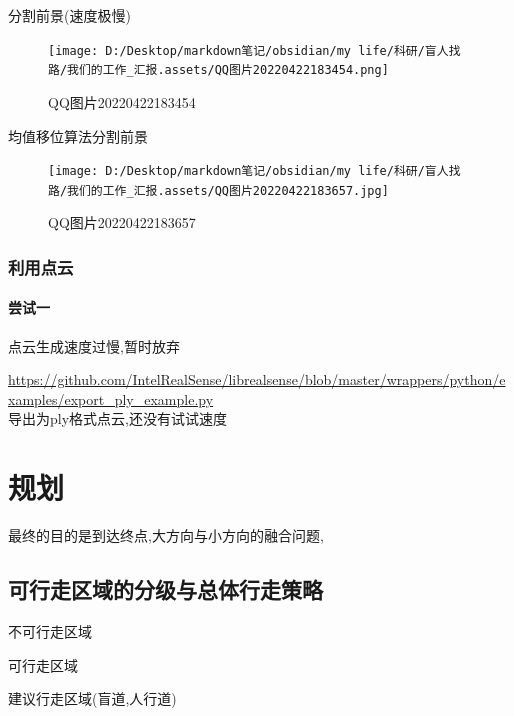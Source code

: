 \documentclass[]{article}
\let\oldparagraph\paragraph
\renewcommand{\paragraph}[1]{\oldparagraph{#1}\mbox{}}
\begin{document}
分割前景(速度极慢)

\begin{figure}
\centering
\texttt{[image: D:/Desktop/markdown笔记/obsidian/my life/科研/盲人找路/我们的工作\_汇报.assets/QQ图片20220422183454.png]}
\caption{QQ图片20220422183454}
\end{figure}

均值移位算法分割前景

\begin{figure}
\centering
\texttt{[image: D:/Desktop/markdown笔记/obsidian/my life/科研/盲人找路/我们的工作\_汇报.assets/QQ图片20220422183657.jpg]}
\caption{QQ图片20220422183657}
\end{figure}

\hypertarget{ux5229ux7528ux70b9ux4e91}{%
\subsubsection{利用点云}\label{ux5229ux7528ux70b9ux4e91}}

\hypertarget{ux5c1dux8bd5ux4e00}{%
\paragraph{尝试一}\label{ux5c1dux8bd5ux4e00}}

点云生成速度过慢,暂时放弃

\url{https://github.com/IntelRealSense/librealsense/blob/master/wrappers/python/examples/export_ply_example.py}\\
导出为ply格式点云,还没有试试速度

\hypertarget{ux89c4ux5212}{%
\section{规划}\label{ux89c4ux5212}}

最终的目的是到达终点,大方向与小方向的融合问题,

\hypertarget{ux53efux884cux8d70ux533aux57dfux7684ux5206ux7ea7ux4e0eux603bux4f53ux884cux8d70ux7b56ux7565}{%
\subsection{可行走区域的分级与总体行走策略}\label{ux53efux884cux8d70ux533aux57dfux7684ux5206ux7ea7ux4e0eux603bux4f53ux884cux8d70ux7b56ux7565}}

不可行走区域

可行走区域

建议行走区域(盲道,人行道)
\end{document}
